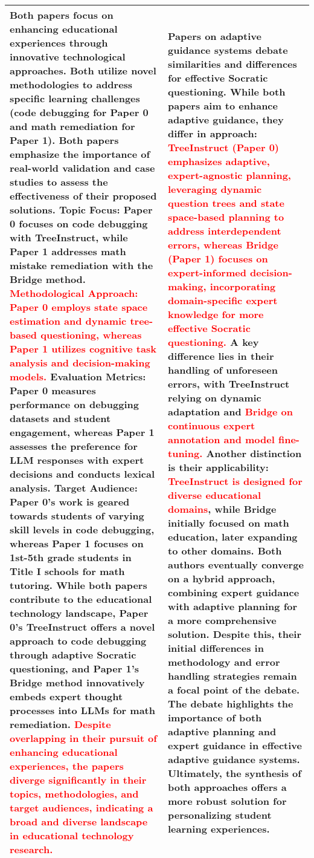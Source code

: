 \begin{table*}[]
\begin{tabular}{|p{8cm}|p{8cm}|}
        Both papers focus on enhancing educational experiences through innovative technological approaches. Both utilize novel methodologies to address specific learning challenges (code debugging for Paper 0 and math remediation for Paper 1). Both papers emphasize the importance of real-world validation and case studies to assess the effectiveness of their proposed solutions. Topic Focus: Paper 0 focuses on code debugging with TreeInstruct, while Paper 1 addresses math mistake remediation with the Bridge method. \textcolor{red}{Methodological Approach: Paper 0 employs state space estimation and dynamic tree-based questioning, whereas Paper 1 utilizes cognitive task analysis and decision-making models.} Evaluation Metrics: Paper 0 measures performance on debugging datasets and student engagement, whereas Paper 1 assesses the preference for LLM responses with expert decisions and conducts lexical analysis. Target Audience: Paper 0's work is geared towards students of varying skill levels in code debugging, whereas Paper 1 focuses on 1st-5th grade students in Title I schools for math tutoring. While both papers contribute to the educational technology landscape, Paper 0's TreeInstruct offers a novel approach to code debugging through adaptive Socratic questioning, and Paper 1's Bridge method innovatively embeds expert thought processes into LLMs for math remediation. \textcolor{red}{Despite overlapping in their pursuit of enhancing educational experiences, the papers diverge significantly in their topics, methodologies, and target audiences, indicating a broad and diverse landscape in educational technology research.} & Papers on adaptive guidance systems debate similarities and differences for effective Socratic questioning. While both papers aim to enhance adaptive guidance, they differ in approach: \textcolor{red}{TreeInstruct (Paper 0) emphasizes adaptive, expert-agnostic planning, leveraging dynamic question trees and state space-based planning to address interdependent errors, whereas Bridge (Paper 1) focuses on expert-informed decision-making, incorporating domain-specific expert knowledge for more effective Socratic questioning.} A key difference lies in their handling of unforeseen errors, with TreeInstruct relying on dynamic adaptation and \textcolor{red}{Bridge on continuous expert annotation and model fine-tuning. }Another distinction is their applicability: \textcolor{red}{TreeInstruct is designed for diverse educational domains}, while Bridge initially focused on math education, later expanding to other domains. Both authors eventually converge on a hybrid approach, combining expert guidance with adaptive planning for a more comprehensive solution. Despite this, their initial differences in methodology and error handling strategies remain a focal point of the debate. The debate highlights the importance of both adaptive planning and expert guidance in effective adaptive guidance systems. Ultimately, the synthesis of both approaches offers a more robust solution for personalizing student learning experiences. \\
\bottomrule
    \end{tabular}
    \label{table: qualitative_study_appendix_part1}
\end{table*}

